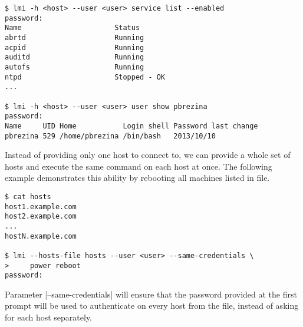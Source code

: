 \begin{lstlisting}[]
$ lmi -h <host> --user <user> service list --enabled
password:
Name                      Status
abrtd                     Running
acpid                     Running
auditd                    Running
autofs                    Running
ntpd                      Stopped - OK
...

$ lmi -h <host> --user <user> user show pbrezina
password:
Name     UID Home           Login shell Password last change
pbrezina 529 /home/pbrezina /bin/bash   2013/10/10
\end{lstlisting}
\funclistend
Instead of providing only one host to connect to, we can provide a whole set
of hosts and execute the same command on each host at once. The following
example demonstrates this ability by rebooting all machines listed in file.
\begin{lstlisting}[]
$ cat hosts
host1.example.com
host2.example.com
...
hostN.example.com

$ lmi --hosts-file hosts --user <user> --same-credentials \
>     power reboot
password:
\end{lstlisting}
\funclistend Parameter |--same-credentials| will ensure that the password
provided at the first prompt will be used to authenticate on every host from the
file, instead of asking for each host separately.

